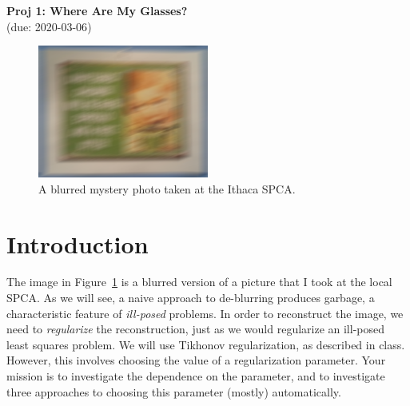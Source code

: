 \documentclass[12pt, leqno]{article} %
\begin{document}
 

  \begin{center}
    {\large {\bf Proj 1: Where Are My Glasses?}} \\
    (due: {2020-03-06})
  \end{center}

\begin{figure}
\begin{center}
\includegraphics[width=0.5\textwidth]{code/proj1/data/blurry.png}
\end{center}
\caption{A blurred mystery photo taken at the Ithaca SPCA.}
\label{fig1}
\end{figure}

\section{Introduction}

The image in Figure~\ref{fig1} is a blurred version of a picture that
I took at the local SPCA.  As we will see, a naive approach to
de-blurring produces garbage, a characteristic feature of {\em ill-posed}
problems.  In order to reconstruct the image, we need to {\em regularize}
the reconstruction, just as we would regularize an ill-posed least squares
problem.  We will use Tikhonov regularization, as described in class.
However, this involves choosing the value of a
regularization parameter.  Your mission is to investigate the dependence
on the parameter, and to investigate three approaches to
choosing this parameter (mostly) automatically.
\end{document}
